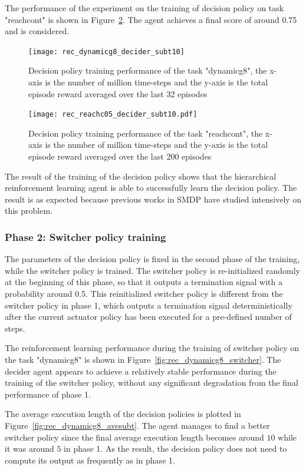 The performance of the experiment on the training of decision policy on task "reachcont" is shown in Figure~\ref{fig:rec_reachc05_decider_subt10}. The agent achieves a final score of around 0.75 and is considered.


\begin{figure}[!htbp]
\centering
\texttt{[image: rec\_dynamicg8\_decider\_subt10]}
\caption{Decision policy training performance of the task "dynamicg8", the x-axis is the number of million time-steps and the y-axis is the total episode reward averaged over the last 32 episodes}
\label{fig:rec_dynamicg8_decider_subt10}
\end{figure}


\begin{figure}
\centering
\texttt{[image: rec\_reachc05\_decider\_subt10.pdf]}
\caption{Decision policy training performance of the task "reachcont", the x-axis is the number of million time-steps and the y-axis is the total episode reward averaged over the last 200 episodes}
\label{fig:rec_reachc05_decider_subt10}
\end{figure}

The result of the training of the decision policy shows that the hierarchical reinforcement learning agent is able to successfully learn the decision policy. The result is as expected because previous works in SMDP have studied intensively on this problem.

\subsubsection{Phase 2: Switcher policy training}
The parameters of the decision policy is fixed in the second phase of the training, while the switcher policy is trained. The switcher policy is re-initialized randomly at the beginning of this phase, so that it outputs a termination signal with a probability around 0.5. This reinitialized switcher policy is different from the switcher policy in phase 1, which outputs a termination signal deterministically after the current actuator policy has been executed for a pre-defined number of steps.

The reinforcement learning performance during the training of switcher policy on the task "dynamicg8" is shown in Figure~\ref{fig:rec_dynamicg8_switcher}. The decider agent appears to achieve a relatively stable performance during the training of the switcher policy, without any significant degradation from the final performance of phase 1.

The average execution length of the decision policies is plotted in Figure~\ref{fig:rec_dynamicg8_avesubt}. The agent manages to find a better switcher policy since the final average execution length becomes around $10$ while it was around $5$ in phase 1. As the result, the decision policy does not need to compute its output as frequently as in phase 1.

